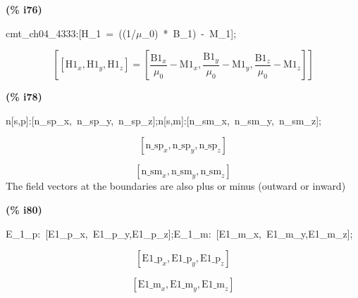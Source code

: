 \documentclass[fleqn]{article}
\begin{document}
\noindent
\begin{minipage}[t]{4.000000em}\color{red}\bfseries
(\% i76)	
\end{minipage}
\begin{minipage}[t]{\textwidth}\color{blue}
cmt\_ch04\_4333:[H\_1\ =\ ((1/\ensuremath{\mu}\_0)\ *\ B\_1)\ -\ M\_1];
\end{minipage}
\[\displaystyle \tag{\% o76} 
\left[ \left[ {{\ensuremath{\mathrm{H1}}}_x}\operatorname{,}{{\ensuremath{\mathrm{H1}}}_y}\operatorname{,}{{\ensuremath{\mathrm{H1}}}_z}\right] =\left[ \frac{{{\ensuremath{\mathrm{B1}}}_x}}{{{\mu }_0}}-{{\ensuremath{\mathrm{M1}}}_x}\operatorname{,}\frac{{{\ensuremath{\mathrm{B1}}}_y}}{{{\mu }_0}}-{{\ensuremath{\mathrm{M1}}}_y}\operatorname{,}\frac{{{\ensuremath{\mathrm{B1}}}_z}}{{{\mu }_0}}-{{\ensuremath{\mathrm{M1}}}_z}\right] \right] \mbox{}
\]


\noindent
\begin{minipage}[t]{4.000000em}\color{red}\bfseries
(\% i78)	
\end{minipage}
\begin{minipage}[t]{\textwidth}\color{blue}
n[s,p]:[n\_sp\_x,\ n\_sp\_y,\ n\_sp\_z];n[s,m]:[n\_sm\_x,\ n\_sm\_y,\ n\_sm\_z];
\end{minipage}
\[\displaystyle \tag{\% o77} 
\left[ {{\ensuremath{\mathrm{n\_ sp}}}_x}\operatorname{,}{{\ensuremath{\mathrm{n\_ sp}}}_y}\operatorname{,}{{\ensuremath{\mathrm{n\_ sp}}}_z}\right] \mbox{}\]

\[\tag{\% o78} 
\left[ {{\ensuremath{\mathrm{n\_ sm}}}_x}\operatorname{,}{{\ensuremath{\mathrm{n\_ sm}}}_y}\operatorname{,}{{\ensuremath{\mathrm{n\_ sm}}}_z}\right] \mbox{}
\]
The field vectors at the boundaries are also plus or minus (outward or inward)


\noindent
\begin{minipage}[t]{4.000000em}\color{red}\bfseries
(\% i80)	
\end{minipage}
\begin{minipage}[t]{\textwidth}\color{blue}
E\_1\_p:\ [E1\_p\_x,\ E1\_p\_y,E1\_p\_z];E\_1\_m:\ [E1\_m\_x,\ E1\_m\_y,E1\_m\_z];
\end{minipage}
\[\displaystyle \tag{\% o79} 
\left[ {{\ensuremath{\mathrm{E1\_ p}}}_x}\operatorname{,}{{\ensuremath{\mathrm{E1\_ p}}}_y}\operatorname{,}{{\ensuremath{\mathrm{E1\_ p}}}_z}\right] \mbox{}\]

\[\tag{\% o80} 
\left[ {{\ensuremath{\mathrm{E1\_ m}}}_x}\operatorname{,}{{\ensuremath{\mathrm{E1\_ m}}}_y}\operatorname{,}{{\ensuremath{\mathrm{E1\_ m}}}_z}\right] \mbox{}
\]
\end{document}
